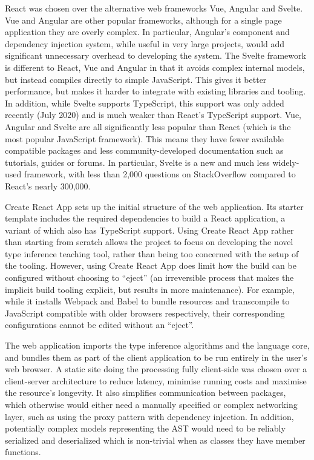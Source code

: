 \documentclass[a4paper,fleqn,oneside,12pt]{report}
\begin{document}
React was chosen over the alternative web frameworks Vue, Angular and Svelte. Vue and Angular are other popular frameworks, although for a single page application they are overly complex. In particular, Angular's component and dependency injection system, while useful in very large projects, would add significant unnecessary overhead to developing the system. The Svelte framework is different to React, Vue and Angular in that it avoids complex internal models, but instead compiles directly to simple JavaScript. This gives it better performance, but makes it harder to integrate with existing libraries and tooling. In addition, while Svelte supports TypeScript, this support was only added recently (July 2020) and is much weaker than React’s TypeScript support. Vue, Angular and Svelte are all significantly less popular than React (which is the most popular JavaScript framework). This means they have fewer available compatible packages and less community-developed documentation such as tutorials, guides or forums. In particular, Svelte is a new and much less widely-used framework, with less than 2,000 questions on StackOverflow compared to React’s nearly 300,000.

Create React App sets up the initial structure of the web application. Its starter template includes the required dependencies to build a React application, a variant of which also has TypeScript support. Using Create React App rather than starting from scratch allows the project to focus on developing the novel type inference teaching tool, rather than being too concerned with the setup of the tooling. However, using Create React App does limit how the build can be configured without choosing to ``eject'' (an irreversible process that makes the implicit build tooling explicit, but results in more maintenance). For example, while it installs Webpack and Babel to bundle resources and transcompile to JavaScript compatible with older browsers respectively, their corresponding configurations cannot be edited without an ``eject''.

The web application imports the type inference algorithms and the language core, and bundles them as part of the client application to be run entirely in the user’s web browser. A static site doing the processing fully client-side was chosen over a client-server architecture to reduce latency, minimise running costs and maximise the resource’s longevity. It also simplifies communication between packages, which otherwise would either need a manually specified or complex networking layer, such as using the proxy pattern with dependency injection. In addition, potentially complex models representing the AST would need to be reliably serialized and deserialized which is non-trivial when as classes they have member functions.
\end{document}
